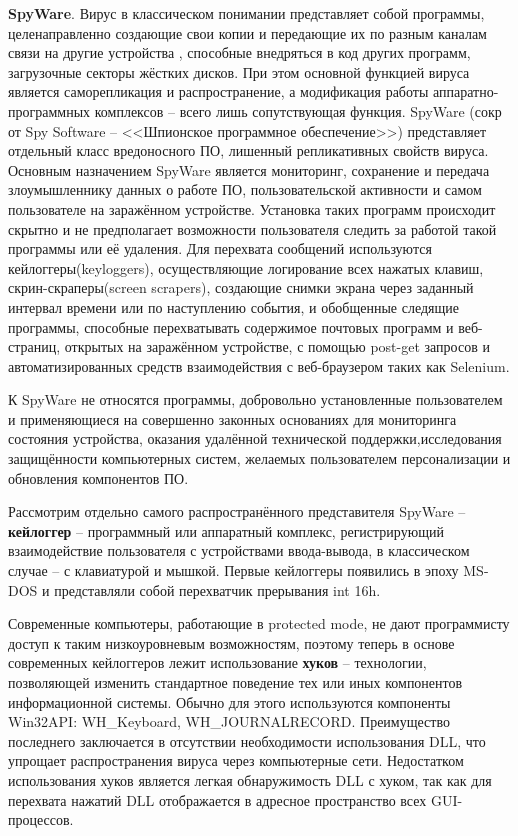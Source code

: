 	\textbf{SpyWare}. Вирус в классическом понимании представляет собой программы, целенаправленно создающие свои копии и передающие их по разным каналам связи на другие устройства , способные внедряться в код других программ, загрузочные секторы жёстких дисков. При этом основной функцией вируса является саморепликация и распространение, а модификация  работы аппаратно-программных комплексов -- всего лишь сопутствующая функция. SpyWare (сокр от Spy Software -- <<Шпионское программное обеспечение>>) представляет отдельный класс вредоносного ПО, лишенный репликативных свойств вируса. Основным назначением SpyWare является мониторинг, сохранение и передача злоумышленнику данных о работе ПО, пользовательской активности и самом пользователе  на заражённом устройстве. Установка таких программ происходит скрытно и не предполагает возможности пользователя следить за работой такой программы или её удаления.     Для перехвата сообщений используются кейлоггеры(keyloggers), осуществляющие логирование всех нажатых клавиш, скрин-скраперы(screen scrapers), создающие снимки экрана через заданный интервал времени или по наступлению события, и обобщенные следящие программы, способные перехватывать содержимое почтовых программ и веб-страниц, открытых на заражённом устройстве, с помощью post-get запросов и автоматизированных средств взаимодействия с веб-браузером таких как Selenium. 
	
	
	К SpyWare не относятся программы, добровольно установленные пользователем и применяющиеся на совершенно  законных основаниях  для мониторинга состояния устройства, оказания удалённой технической поддержки,исследования защищённости компьютерных систем, желаемых пользователем персонализации и обновления компонентов ПО. \cite{MailWare1} %
	
	Рассмотрим отдельно самого распространённого представителя SpyWare -- \textbf{кейлоггер} -- программный или аппаратный комплекс, регистрирующий взаимодействие пользователя с устройствами ввода-вывода, в классическом случае -- с клавиатурой и мышкой. \cite{MailWare2} %
	Первые кейлоггеры появились в эпоху MS-DOS и представляли собой перехватчик прерывания int  16h. \cite{INT16H}	 %
	
	
	Современные компьютеры, работающие в protected mode, не дают программисту доступ к таким низкоуровневым возможностям, поэтому теперь в основе современных кейлоггеров лежит использование \textbf{хуков} -- технологии, позволяющей изменить стандартное поведение тех или иных компонентов информационной системы. Обычно для этого используются компоненты Win32API: WH\_Keyboard, WH\_JOURNALRECORD. Преимущество последнего заключается в отсутствии необходимости использования DLL, что упрощает распространения вируса через компьютерные сети. Недостатком использования хуков является легкая обнаружимость DLL с хуком, так как для перехвата нажатий DLL отображается в адресное пространство всех GUI-процессов. 
	
